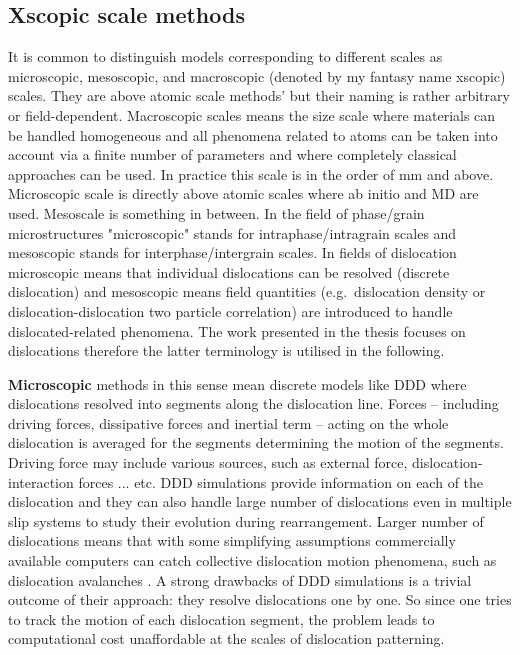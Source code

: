 \subsection{Xscopic scale methods}
It is common to distinguish models corresponding to different scales as microscopic, mesoscopic, and macroscopic (denoted by my fantasy name xscopic) scales. They are above atomic scale methods' but their naming is rather arbitrary or field-dependent. Macroscopic scales means the size scale where materials can be handled homogeneous and all phenomena related to atoms can be taken into account via a finite number of parameters and where completely classical approaches can be used. In practice this scale is in the order of \si{\milli\meter} and above. Microscopic scale is directly above atomic scales where ab initio and MD are used. Mesoscale is something in between. In the field of phase/grain microstructures "microscopic" stands for intraphase/intragrain scales and mesoscopic stands for interphase/intergrain scales\cite{Rotersbook}. In fields of dislocation microscopic means that individual dislocations can be resolved (discrete dislocation) and mesoscopic means field quantities (e.g.\ dislocation density or dislocation-dislocation two particle correlation) are introduced to handle dislocated-related phenomena. The work presented in the thesis focuses on dislocations therefore the latter terminology is utilised in the following.

\textbf{Microscopic} methods in this sense mean discrete models like DDD where dislocations resolved into segments along the dislocation line. Forces -- including driving forces, dissipative forces and inertial term -- acting on the whole dislocation is averaged for the segments determining the motion of the segments. Driving force may include various sources, such as external force, dislocation-interaction forces ... etc. DDD simulations provide information on each of the dislocation and they can also handle large number of dislocations even in multiple slip systems to study their evolution during rearrangement. Larger number of dislocations means that with some simplifying assumptions commercially available computers can catch collective dislocation motion phenomena, such as dislocation avalanches \cite{Csikor251,ovaska2015quenched,PhysRevLett.112.235501}. A strong drawbacks of DDD simulations is a trivial outcome of their approach: they resolve dislocations one by one. So since one tries to track the motion of each dislocation segment, the problem leads to computational cost unaffordable at the scales of dislocation patterning.

